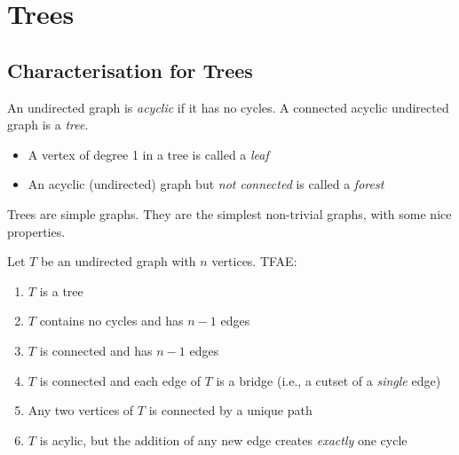 \chapter{Trees}
\section{Characterisation for Trees}
\begin{definition}[Tree]
An undirected graph is \emph{acyclic} if it has no cycles.
A connected acyclic undirected graph is a \emph{tree}.
\begin{itemize}
\item
A vertex of degree 1 in a tree is called a \emph{leaf}
\item
An acyclic (undirected) graph but \emph{not connected} is called a \emph{forest	}
\end{itemize}
\end{definition}
\begin{remark}
Trees are simple graphs. They are the simplest non-trivial graphs, with some nice properties.
\end{remark}
\begin{theorem}\label{The:4:1}
Let $T$ be an undirected graph with $n$ vertices. TFAE:
\begin{enumerate}
\item
$T$ is a tree
\item
$T$ contains no cycles and has $n-1$ edges
\item
$T$ is connected and has $n-1$ edges
\item
$T$ is connected and each edge of $T$ is a bridge (i.e., a cutset of a \emph{single} edge)
\item
Any two vertices of $T$ is connected by a unique path
\item
$T$ is acylic, but the addition of any new edge creates \emph{exactly} one cycle
\end{enumerate}
\end{theorem}
